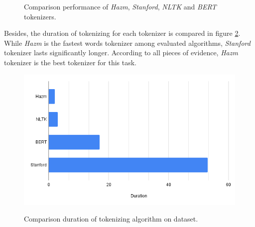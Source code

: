 \begin{figure}%
	\centering
	\qquad
	\qquad
	\caption{Comparison performance of \textit{Hazm}, \textit{Stanford}, \textit{NLTK} and \textit{BERT} tokenizers.}%
	\label{fig:tekenres}%
\end{figure}

	Besides, the duration of tokenizing for each tokenizer is compared in figure \ref{fig:tokentime}. While \textit{Hazm} is the fastest words tokenizer among evaluated algorithms, \textit{Stanford} tokenizer lasts significantly longer. According to all pieces of evidence, \textit{Hazm} tokenizer is the best tokenizer for this task.

\begin{figure}%
	\centering
	{\includegraphics[width=12.5cm]{statistics/tokenizer/duration.png} }
	\caption{Comparison duration of tokenizing algorithm on \cite{stance_persian} dataset.}%
	\label{fig:tokentime}%
\end{figure}

